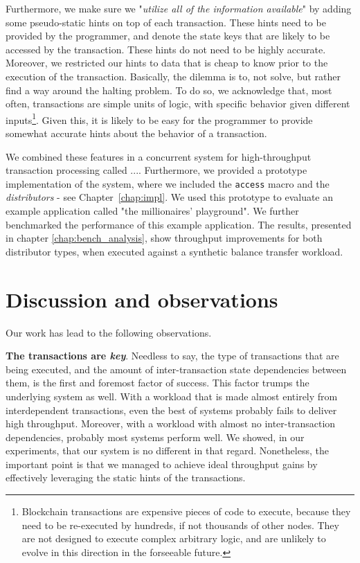 Furthermore, we make sure we "\textit{utilize all of the information available}" by adding some
pseudo-static hints on top of each transaction. These  hints need to be provided by the programmer,
and denote the state keys that are likely to be accessed by the transaction. These hints do not need
to be highly accurate. Moreover, we restricted our hints to data that is cheap to know prior to the
execution of the transaction. Basically, the dilemma is to, not solve, but rather find a way around
the halting problem\cite{burkholderHaltingProblem1987}. To do so, we acknowledge that, most often,
transactions are simple units of logic, with specific behavior given different
inputs\footnote{Blockchain transactions are expensive pieces of code to execute, because they need
to be re-executed by hundreds, if not thousands of other nodes. They are not designed to execute
complex arbitrary logic, and are unlikely to evolve in this direction in the forseeable future.}.
Given this, it is likely to be easy for the programmer to provide somewhat accurate hints about the
behavior of a transaction.

We combined these features in a concurrent system for high-throughput transaction processing called ....
Furthermore, we provided a prototype implementation of the system, where we included
the \texttt{access} macro and the \textit{distributors} - see Chapter~\ref{chap:impl}.
We used this prototype to evaluate an example application called "the millionaires' playground".
We further benchmarked the performance of this example application. The results, presented
in chapter \ref{chap:bench_analysis}, show throughput improvements for both
distributor types, when executed against a synthetic balance transfer workload.



\section{Discussion and observations}

Our work has lead to the following observations.

\textbf{The transactions are \textit{key}}. Needless to say, the type of transactions that are being
executed, and the amount of inter-transaction state dependencies between them, is the first and
foremost factor of success. This factor trumps the underlying system as well. With a workload that
is made almost entirely from interdependent transactions, even the best of systems probably fails to
deliver high throughput. Moreover, with a workload with almost no inter-transaction dependencies,
probably most systems perform well. We showed, in our experiments, that our system is no different
in that regard. Nonetheless, the important point is that we managed to achieve ideal throughput
gains by effectively leveraging the static hints of the transactions.

